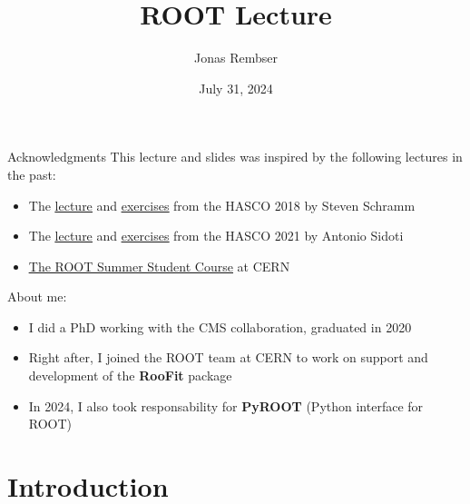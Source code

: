 \documentclass[aspectratio=169]{beamer}
\title[Your Short Title]{ROOT Lecture}
\author{Jonas Rembser}
\institute{CERN (EP-SFT)}
\date{July 31, 2024}
\newcommand{\myhref}[2]{{\color{blue}\href{#1}{\underline{#2}}}}
\begin{document}
\begin{frame}
    \titlepage
\end{frame}


\begin{frame}{Acknowledgments}
    This lecture and slides was inspired by the following lectures in the past:
    \vspace{3mm}
    \begin{itemize}
        \item The \myhref{https://indico.cern.ch/event/704163/contributions/2936717/attachments/1690757/2720489/StevenSchramm-IntroROOT.pdf}{lecture} and \myhref{https://indico.cern.ch/event/704163/contributions/2936719/attachments/1693833/2727086/Tutorial-ROOT.pdf}{exercises} from the HASCO 2018 by Steven Schramm
        \item The \myhref{https://indico.cern.ch/event/999261/contributions/4197218/attachments/2285603/3884654/hasco_root_2021.pdf}{lecture} and \myhref{https://indico.cern.ch/event/999261/contributions/4197219/attachments/2285604/3884655/hasco_root_tutorial_2021.pdf}{exercises} from the HASCO 2021 by Antonio Sidoti
        \item \myhref{https://github.com/root-project/student-course}{The ROOT Summer Student Course} at CERN
    \end{itemize}
    \vspace{9mm}

    About me:
    \vspace{3mm}
    \begin{itemize}
    \item I did a PhD working with the CMS collaboration, graduated in 2020
    \item Right after, I joined the ROOT team at CERN to work on support and development of the \textbf{RooFit} package
    \item In 2024, I also took responsability for \textbf{PyROOT} (Python interface for ROOT)
    \end{itemize}
\end{frame}

\section{Introduction}
\end{document}
